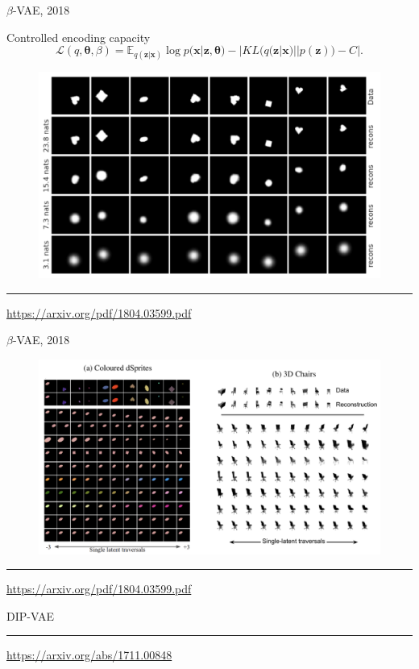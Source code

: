 \documentclass{beamer}
\newcommand{\bx}{\mathbf{x}}
\newcommand{\bz}{\mathbf{z}}
\newcommand{\btheta}{\boldsymbol{\theta}}
\begin{document}
\begin{frame}{$\beta$-VAE, 2018}
\begin{block}{Controlled encoding capacity}
\vspace{-0.5cm}
\[
    \mathcal{L}(q, \btheta, \beta) = \mathbb{E}_{q(\bz | \bx)} \log p(\bx | \bz, \btheta) - | KL (q(\bz | \bx) || p(\bz)) - C|.
\]
\end{block}
\begin{figure}
    \centering
    \includegraphics[width=0.8\linewidth]{figs/betaVAE_8.png}
\end{figure}
\vfill
\hrule\medskip
{\scriptsize \href{https://arxiv.org/pdf/1804.03599.pdf}{https://arxiv.org/pdf/1804.03599.pdf}}
\end{frame}
\begin{frame}{$\beta$-VAE, 2018}
\begin{figure}
    \centering
    \includegraphics[width=\linewidth]{figs/betaVAE_9.png}
\end{figure}
\vfill
\hrule\medskip
{\scriptsize \href{https://arxiv.org/pdf/1804.03599.pdf}{https://arxiv.org/pdf/1804.03599.pdf}}
\end{frame}
\begin{frame}{DIP-VAE}
	
	\vfill
	\hrule\medskip
	{\scriptsize \href{https://arxiv.org/abs/1711.00848}{https://arxiv.org/abs/1711.00848}}
\end{frame}
\end{document}
